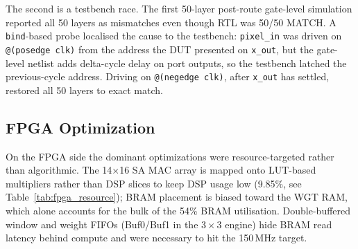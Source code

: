 The second is a testbench race. The first 50-layer post-route gate-level simulation reported all 50 layers as mismatches even though RTL was 50/50 MATCH. A \texttt{bind}-based probe localised the cause to the testbench: \texttt{pixel\_in} was driven on \texttt{@(posedge clk)} from the address the DUT presented on \texttt{x\_out}, but the gate-level netlist adds delta-cycle delay on port outputs, so the testbench latched the previous-cycle address. Driving on \texttt{@(negedge clk)}, after \texttt{x\_out} has settled, restored all 50 layers to exact match.

\subsection{FPGA Optimization}
\label{sec:opt:fpga}


On the FPGA side the dominant optimizations were resource-targeted rather than algorithmic. The 14$\times$16 SA MAC array is mapped onto LUT-based multipliers rather than DSP slices to keep DSP usage low (9.85\%, see Table~\ref{tab:fpga_resource}); BRAM placement is biased toward the WGT RAM, which alone accounts for the bulk of the 54\% BRAM utilisation. Double-buffered window and weight FIFOs (Buf0/Buf1 in the $3\times3$ engine) hide BRAM read latency behind compute and were necessary to hit the 150\,MHz target.
